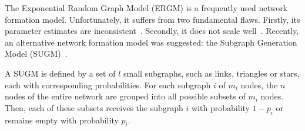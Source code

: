 \documentclass[conference]{IEEEtran}
\begin{document}
The Exponential Random Graph Model (ERGM) is a frequently used network formation model. Unfortunately, it suffers from two fundamental flaws. Firstly, its parameter estimates are inconsistent~\cite{Shalizi2013,Chatterjee2013}. Secondly, it does not scale well~\cite{Bhamidi2011}. Recently, an alternative network formation model was suggested: the Subgraph Generation Model (SUGM)~\cite{Chandrasekhar2014,Chandrasekhar2015,Chandrasekhar2016}.

A SUGM is defined by a set of $l$ small subgraphs, such as links, triangles or stars, each with corresponding probabilities. For each subgraph $i$ of $m_{i}$ nodes, the $n$ nodes of the entire network are grouped into all possible subsets of $m_{i}$ nodes. Then, each of these subsets receives the subgraph $i$ with probability $1-p_{i}$ or remains empty with probability $p_{i}$.
\end{document}
